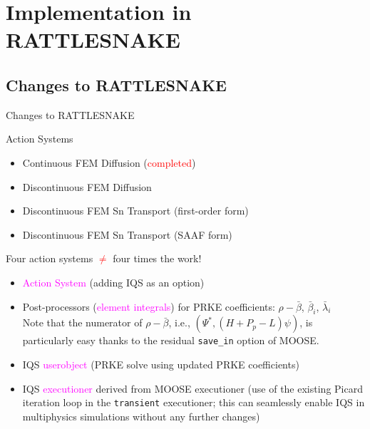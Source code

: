 \documentclass[8pt]{beamer}
\newcommand{\bi}{\begin{itemize}}
\newcommand{\ei}{\end{itemize}}
\newcommand{\tcr}[1]{\textcolor{red}{#1}}
\newcommand{\tcm}[1]{\textcolor{magenta}{#1}}
\begin{document}
\section{Implementation in RATTLESNAKE}

\subsection{Changes to RATTLESNAKE}

\begin{frame}{Changes to RATTLESNAKE}

\begin{block}{Action Systems}
\bi
\item Continuous FEM Diffusion (\tcr{completed})
\item Discontinuous FEM Diffusion
\item Discontinuous FEM Sn Transport (first-order form)
\item Discontinuous FEM Sn Transport (SAAF form)
\ei
Four action systems \tcr{$\ne$} four times the work!
\end{block}

\begin{block}{}
\bi
\item \tcm{Action System} (adding IQS as an option)
\item Post-processors (\tcm{element integrals}) for PRKE coefficients: $\rho-\bar{\beta}$, $\bar{\beta}_i$, $\bar{\lambda}_i$\\
Note that the numerator of $\rho-\bar{\beta}$, i.e., $\left( \Psi^{*}, (H+P_p-L) \psi \right)$, is particularly easy thanks to the residual {\tt save\_in} option of MOOSE.
\item IQS \tcm{userobject} (PRKE solve using updated PRKE coefficients)
\item IQS \tcm{executioner} derived from MOOSE executioner (use of the existing Picard iteration loop in the {\tt transient} executioner; this can seamlessly enable IQS in multiphysics simulations without any further changes)
\ei
\end{block}

\end{frame}
\end{document}
